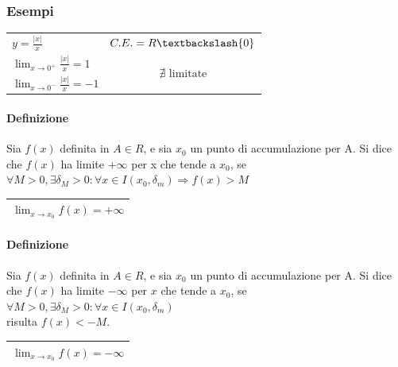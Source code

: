 \subsubsection{Esempi}
\begin{tabular}{lc}
	$y=\frac{|x|}{x}$ & $C.E. = R\textbackslash \{0\}$\\
	$\lim_{x\to 0^+}\frac{|x|}{x}=1$&\multirow{2}{*}{$\nexists \text{ limitate}$} \\
	$\lim_{x\to 0^-}\frac{|x|}{x}=-1$&\\
\end{tabular}
\paragraph{Definizione} Sia $f(x)$ definita in $A \in R$, e sia $x_0$ un punto
di accumulazione per A. Si dice che $f(x)$ ha limite $+\infty$ per x che tende
a $x_0$, se $\forall M>0,\exists \delta_M>0:\forall x \in
I(x_0,\delta_m)\Rightarrow f(x)>M$
\begin{center}
	\begin{tabular}{|l|}
		\hline
		$\lim_{x\to x_0}f(x)=+\infty$\\\hline
	\end{tabular}
\end{center}
\paragraph{Definizione} Sia $f(x)$ definita in $A\in R$, e sia $x_0$ un punto
di accumulazione per A. Si dice che $f(x)$ ha limite $-\infty$ per $x$ che
tende a $x_0$, se $\forall M>0, \exists \delta_M>0:\forall x \in
I(x_0,\delta_m)$\\
risulta $f(x)<-M$.
\begin{center}
	\begin{tabular}{|l|}
		\hline
		$\lim_{x\to x_0}f(x)=-\infty$\\\hline
	\end{tabular}
\end{center}
